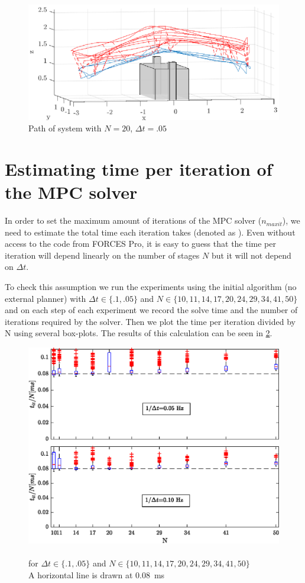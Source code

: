 \begin{figure}
	\centering
	\includegraphics[width=.7\linewidth]{Figures/debug_log}
	\caption{Path of system with $N=20$, $\Delta t=.05$}
	\label{fig::debug_log}
\end{figure}

\section{Estimating time per iteration of the \ac{MPC} solver}
\label{subsect::time_per_it}
In order to set the maximum amount of iterations of the \ac{MPC} solver ($n_{maxit}$), we need to estimate the total time each iteration takes (denoted as ). Even without access to the code from FORCES Pro, it is easy to guess that the time per iteration will depend linearly on the number of stages $N$ but it will not depend on $\Delta t$.

To check this assumption we run the experiments using the initial algorithm (no external planner) with $\Delta t\in\{.1,.05\}$ and $N\in\{10,11,14,17,20,24,29,34,41,50\}$ and on each step of each experiment we record the solve time and the number of iterations required by the solver. Then we plot the time per iteration divided by N using several box-plots. The results of this calculation can be seen in \cref{fig::time_per_it}.

\begin{figure}
	\centering
	\includegraphics[width=.7\linewidth]{Figures/time_per_it}
	\caption[Graph of $t_{it}/N$]{ \\ for $\Delta t\in\{.1,.05\}$ and $N\in\{10,11,14,17,20,24,29,34,41,50\}$ \\ A horizontal line is drawn at \SI{.08}{\milli\second}}
	\label{fig::time_per_it}
\end{figure}

